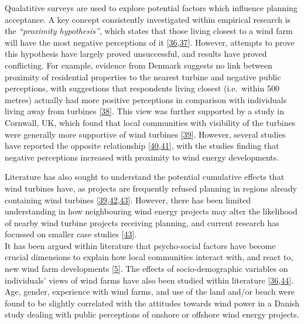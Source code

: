 \documentclass[a4paper,]{article}
\theoremstyle{definition}
\theoremstyle{definition}
\theoremstyle{definition}
\theoremstyle{remark}
\begin{document}
Qualatitive surveys are used to explore potential factors which
influence planning acceptance. A key concept consistently investigated
within empirical research is the \emph{``proximity hypothesis''}, which
states that those living closest to a wind farm will have the most
negative perceptions of it
{[}\protect\hyperlink{ref-Devine-Wright2005}{36},\protect\hyperlink{ref-Warren2005}{37}{]}.
However, attempts to prove this hypothesis have largely proved
unsuccessful, and results have proved conflicting. For example, evidence
from Denmark suggests no link between proximity of residential
properties to the nearest turbine and negative public perceptions, with
suggestions that respondents living closest (i.e.~within 500 metres)
actually had more positive perceptions in comparison with individuals
living away from turbines {[}\protect\hyperlink{ref-Krohn1999}{38}{]}.
This view was further supported by a study in Cornwall, UK, which found
that local communities with visibility of the turbines were generally
more supportive of wind turbines
{[}\protect\hyperlink{ref-Eltham2008}{39}{]}. However, several studies
have reported the opposite relationship
{[}\protect\hyperlink{ref-Meyerhoff2010}{40},\protect\hyperlink{ref-Ladenburg2006}{41}{]},
with the studies finding that negative perceptions increased with
proximity to wind energy developments.

Literature has also sought to understand the potential cumulative
effects that wind turbines have, as projects are frequently refused
planning in regions already containing wind turbines
{[}\protect\hyperlink{ref-Eltham2008}{39},\protect\hyperlink{ref-Strachan2004}{42},\protect\hyperlink{ref-Jones2011}{43}{]}.
However, there has been limited understanding in how neighbouring wind
energy projects may alter the likelihood of nearby wind turbine projects
receiving planning, and current research has focussed on smaller case
studies {[}\protect\hyperlink{ref-Jones2011}{43}{]}.\\
It has been argued within literature that psycho-social factors have
become crucial dimensions to explain how local communities interact
with, and react to, new wind farm developments
{[}\protect\hyperlink{ref-Langer2016}{5}{]}. The effects of
socio-demographic variables on individuals' views of wind farms have
also been studied within literature
{[}\protect\hyperlink{ref-Devine-Wright2005}{36},\protect\hyperlink{ref-Warren2010}{44}{]}.
Age, gender, experience with wind farms, and use of the land and/or
beach were found to be slightly correlated with the attitudes towards
wind power in a Danish study dealing with public perceptions of onshore
or offshore wind energy projects.
\end{document}
